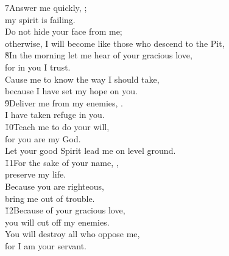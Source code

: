 \begin{poetry}
\poeml \v{7}Answer me quickly, ; \\
\poemll    my spirit is failing. \\
\poeml Do not hide your face from me; \\
\poemll    otherwise, I will become like those who descend to the Pit, \\
\poeml \v{8}In the morning let me hear of your gracious love, \\
\poemll    for in you I trust. \\
\poeml Cause me to know the way I should take, \\
\poemll    because I have set my hope on you. \\
\poeml \v{9}Deliver me from my enemies, . \\
\poemll    I have taken refuge in you. \\
\poeml \v{10}Teach me to do your will, \\
\poemll    for you are my God. \\
\poemlll       Let your good Spirit lead me on level ground. \\
\poeml \v{11}For the sake of your name, , \\
\poemll    preserve my life. \\
\poeml Because you are righteous, \\
\poemll    bring me out of trouble. \\
\poeml \v{12}Because of your gracious love, \\
\poemll    you will cut off my enemies. \\
\poeml You will destroy all who oppose me, \\
\poemll    for I am your servant.
\end{poetry}

